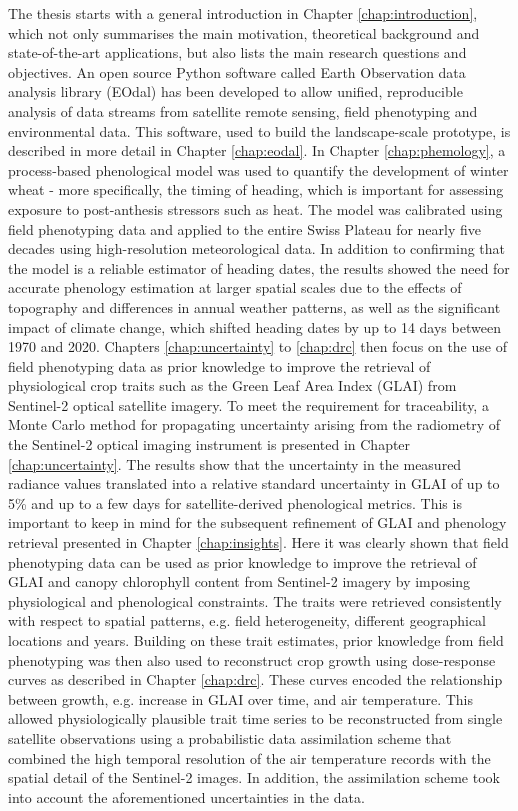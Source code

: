 The thesis starts with a general introduction in Chapter \ref{chap:introduction}, which not only summarises the main motivation, theoretical background and state-of-the-art applications, but also lists the main research questions and objectives.
An open source Python software called Earth Observation data analysis library (EOdal) has been developed to allow unified, reproducible analysis of data streams from satellite remote sensing, field phenotyping and environmental data. This software, used to build the landscape-scale prototype, is described in more detail in Chapter \ref{chap:eodal}.
In Chapter \ref{chap:phemology}, a process-based phenological model was used to quantify the development of winter wheat - more specifically, the timing of heading, which is important for assessing exposure to post-anthesis stressors such as heat. The model was calibrated using field phenotyping data and applied to the entire Swiss Plateau for nearly five decades using high-resolution meteorological data. In addition to confirming that the model is a reliable estimator of heading dates, the results showed the need for accurate phenology estimation at larger spatial scales due to the effects of topography and differences in annual weather patterns, as well as the significant impact of climate change, which shifted heading dates by up to 14 days between 1970 and 2020.
Chapters \ref{chap:uncertainty} to \ref{chap:drc} then focus on the use of field phenotyping data as prior knowledge to improve the retrieval of physiological crop traits such as the Green Leaf Area Index (GLAI) from Sentinel-2 optical satellite imagery. To meet the requirement for traceability, a Monte Carlo method for propagating uncertainty arising from the radiometry of the Sentinel-2 optical imaging instrument is presented in Chapter \ref{chap:uncertainty}. The results show that the uncertainty in the measured radiance values translated into a relative standard uncertainty in GLAI of up to 5\% and up to a few days for satellite-derived phenological metrics. This is important to keep in mind for the subsequent refinement of GLAI and phenology retrieval presented in Chapter \ref{chap:insights}. Here it was clearly shown that field phenotyping data can be used as prior knowledge to improve the retrieval of GLAI and canopy chlorophyll content from Sentinel-2 imagery by imposing physiological and phenological constraints. The traits were retrieved consistently with respect to spatial patterns, e.g. field heterogeneity, different geographical locations and years. Building on these trait estimates, prior knowledge from field phenotyping was then also used to reconstruct crop growth using dose-response curves as described in Chapter \ref{chap:drc}. These curves encoded the relationship between growth, e.g. increase in GLAI over time, and air temperature. This allowed physiologically plausible trait time series to be reconstructed from single satellite observations using a probabilistic data assimilation scheme that combined the high temporal resolution of the air temperature records with the spatial detail of the Sentinel-2 images. In addition, the assimilation scheme took into account the aforementioned uncertainties in the data.
